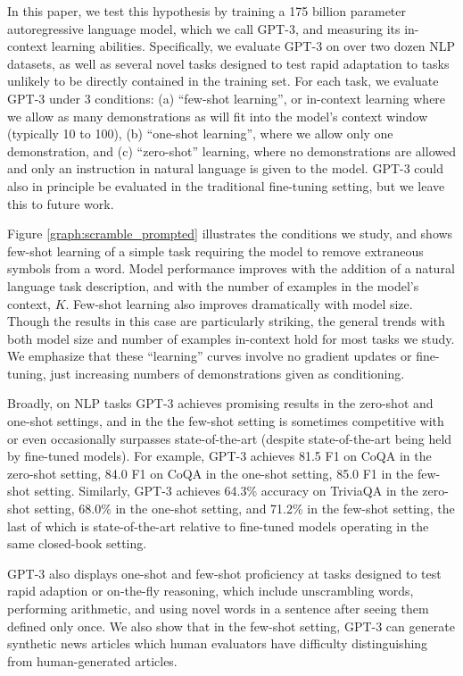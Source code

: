 In this paper, we test this hypothesis by training a 175 billion parameter autoregressive language model, which we call GPT-3, and measuring its in-context learning abilities.  Specifically, we evaluate GPT-3 on over two dozen NLP datasets, as well as several novel tasks designed to test rapid adaptation to tasks unlikely to be directly contained in the training set.  For each task, we evaluate GPT-3 under 3 conditions: (a) ``few-shot learning'', or in-context learning where we allow as many demonstrations as will fit into the model’s context window (typically 10 to 100), (b) ``one-shot learning'', where we allow only one demonstration, and (c) ``zero-shot'' learning, where no demonstrations are allowed and only an instruction in natural language is given to the model.  GPT-3 could also in principle be evaluated in the traditional fine-tuning setting, but we leave this to future work.

 Figure \ref{graph:scramble_prompted} illustrates the conditions we study, and shows few-shot learning of a simple task requiring the model to remove extraneous symbols from a word. Model performance improves with the addition of a natural language task description, and with the number of examples in the model's context, $K$. Few-shot learning also improves dramatically with model size.  Though the results in this case are particularly striking, the general trends with both model size and number of examples in-context hold for most tasks we study.  We emphasize that these ``learning'' curves involve no gradient updates or fine-tuning, just increasing numbers of demonstrations given as conditioning.

Broadly, on NLP tasks GPT-3 achieves promising results in the zero-shot and one-shot settings, and in the the few-shot setting is sometimes competitive with or even occasionally surpasses state-of-the-art (despite state-of-the-art being held by fine-tuned models).  For example, GPT-3 achieves 81.5 F1 on CoQA in the zero-shot setting, 84.0 F1 on CoQA in the one-shot setting, 85.0 F1 in the few-shot setting.  Similarly, GPT-3 achieves 64.3\% accuracy on TriviaQA in the zero-shot setting, 68.0\% in the one-shot setting, and 71.2\% in the few-shot setting, the last of which is state-of-the-art relative to fine-tuned models operating in the same closed-book setting.

GPT-3 also displays one-shot and few-shot proficiency at tasks designed to test rapid adaption or on-the-fly reasoning, which include unscrambling words, performing arithmetic, and using novel words in a sentence after seeing them defined only once.  We also show that in the few-shot setting, GPT-3 can generate synthetic news articles which human evaluators have difficulty distinguishing from human-generated articles.


